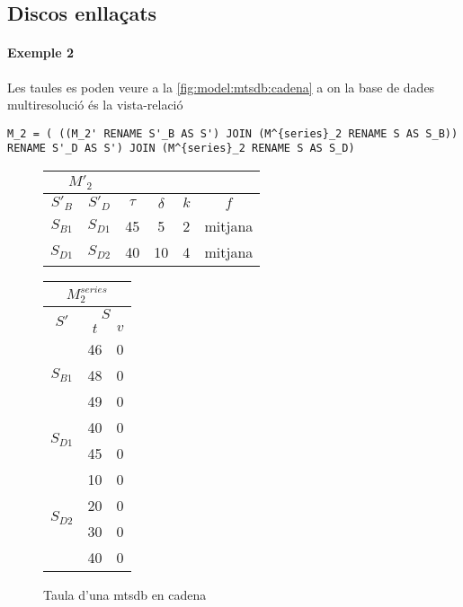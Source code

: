 \subsection{Discos enllaçats}



\paragraph{Exemple 2}

Les taules es poden veure a la \autoref{fig:model:mtsdb:cadena} a on la base de dades multiresolució és la vista-relació 
\begin{verbatim}
M_2 = ( ((M_2' RENAME S'_B AS S') JOIN (M^{series}_2 RENAME S AS S_B)) RENAME S'_D AS S') JOIN (M^{series}_2 RENAME S AS S_D)
\end{verbatim}



\begin{figure}[tp]
  \centering
  \begin{tabular}{|c|c|c|c|c|c|}
    \multicolumn{2}{c}{$M'_2$} \\ \hline
    $S'_B$  & $S'_D$ & $\tau$ & $\delta$ & $k$ & $f$ \\ \hline
    $S_{B1}$ & $S_{D1}$ & 45 & 5  & 2 & mitjana  \\
    $S_{D1}$ & $S_{D2}$ & 40 & 10 & 4 & mitjana  \\ \hline
  \end{tabular}\qquad
  \begin{tabular}{|c|c|c|}
    \multicolumn{3}{c}{$M^{series}_{2}$} \\ \hline
    \multirow{2}{*}{$S'$}  &  \multicolumn{2}{c|}{$S$} \\ \cline{2-3}
    & $t$      & $v$  \\ \hline
    \multirow{3}{*}{$S_{B1}$} & 46 & 0 \\ 
    & 48 & 0 \\ 
    & 49 & 0 \\ \hline
    \multirow{2}{*}{$S_{D1}$} & 40 & 0 \\ 
    & 45 & 0 \\ \hline
    \multirow{4}{*}{$S_{D2}$} & 10 & 0 \\ 
    & 20 & 0 \\ 
    & 30 & 0 \\ 
    & 40 & 0 \\ \hline
  \end{tabular}
  \caption{Taula d'una mtsdb en cadena}
  \label{fig:model:mtsdb:cadena}
\end{figure}

